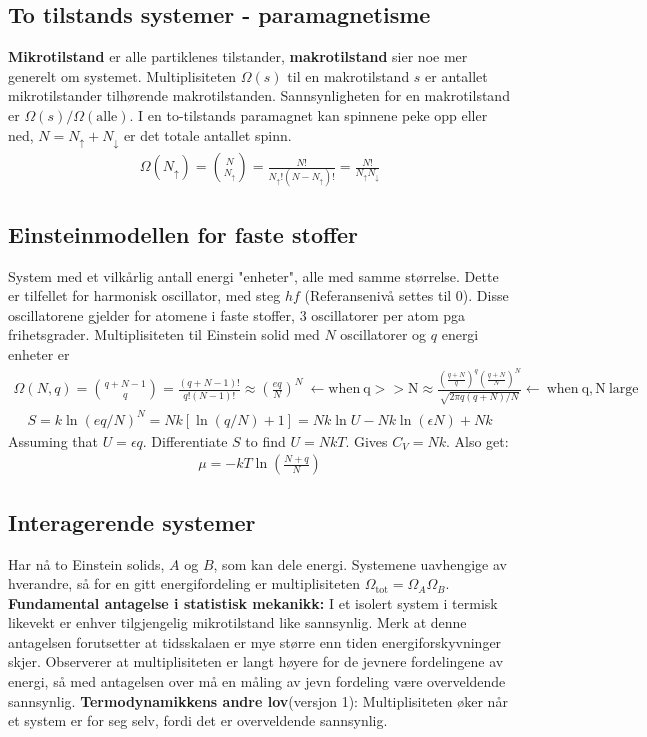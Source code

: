 \documentclass[12pt]{article}
\begin{document}
\subsection{To tilstands systemer - paramagnetisme}
\textbf{Mikrotilstand} er alle partiklenes tilstander, \textbf{makrotilstand} sier
noe mer generelt om systemet. Multiplisiteten $\Omega(s)$ til en makrotilstand $s$ er antallet mikrotilstander
tilhørende makrotilstanden. Sannsynligheten for en makrotilstand er $\Omega(s)/\Omega(\text{alle})$. I en
to-tilstands paramagnet kan spinnene peke opp eller ned, $N = N_\uparrow + N_\downarrow$ er det totale antallet
spinn.
\begin{align*}
  \Omega(N_\uparrow) = \binom{N}{N_\uparrow} = \frac{N!}{N_\uparrow! (N - N_\uparrow)!} = \frac{N!}{N_\uparrow N_\downarrow}
\end{align*}
\subsection{Einsteinmodellen for faste stoffer}
System med et vilkårlig antall energi "enheter", alle med samme størrelse. Dette
er tilfellet for harmonisk oscillator, med steg $hf$ (Referansenivå settes til 0).
Disse oscillatorene gjelder for atomene i faste stoffer, 3 oscillatorer per atom
pga frihetsgrader. Multiplisiteten til Einstein solid med $N$ oscillatorer og
$q$ energi enheter er
\begin{align*}
\Omega(N,q)={q+N-1\choose q}=\frac{(q+N-1)!}{q!(N-1)!}\approx \left(\frac{eq}{N}\right)^N\ \leftarrow \mathrm{when\ q>>N} \approx \frac{\left(\frac{q+N}{q}\right)^q\left(\frac{q+N}{N}\right)^N}{\sqrt{2\pi q(q+N)/N}} \leftarrow\ \mathrm{when\ q,N\ large}
\end{align*}
\begin{align*}
S=k\ln (eq/N)^N=Nk[\ln(q/N)+1]=Nk\ln U-Nk\ln(\epsilon N)+Nk
\end{align*}
Assuming that $U=\epsilon q$. Differentiate $S$ to find $U=NkT$. Gives $C_V=Nk$. Also get:
\begin{align*}
\mu = -kT\ln \left(\frac{N+q}{N}\right)
\end{align*}
\subsection{Interagerende systemer}
Har nå to Einstein solids, $A$ og $B$, som kan dele energi. Systemene uavhengige
av hverandre, så for en gitt energifordeling er multiplisiteten $\Omega_\text{tot} = \Omega_A \Omega_B$.\newline \noindent
\textbf{Fundamental antagelse i statistisk mekanikk:} I et isolert system i termisk
likevekt er enhver tilgjengelig mikrotilstand like sannsynlig. Merk at denne antagelsen
forutsetter at tidsskalaen er mye større enn tiden energiforskyvninger skjer. \newline \noindent
Observerer at multiplisiteten er langt høyere for de jevnere fordelingene av energi,
så med antagelsen over må en måling av jevn fordeling være overveldende sannsynlig.
\textbf{Termodynamikkens andre lov}(versjon 1): Multiplisiteten øker når et system
er for seg selv, fordi det er overveldende sannsynlig.
\end{document}
